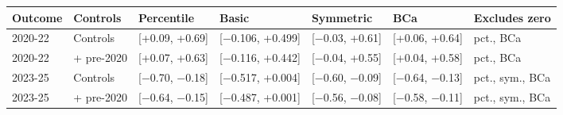 \footnotesize\setlength{\tabcolsep}{3pt}
\begin{tabular}{lllllll}
\toprule
Outcome & Controls & Percentile & Basic & Symmetric & BCa & Excludes zero \\
\midrule
2020-22 & Controls & [+0.09, +0.69] & [$-$0.106, +0.499] & [$-$0.03, +0.61] & [+0.06, +0.64] & pct., BCa \\
2020-22 & + pre-2020 & [+0.07, +0.63] & [$-$0.116, +0.442] & [$-$0.04, +0.55] & [+0.04, +0.58] & pct., BCa \\
2023-25 & Controls & [$-$0.70, $-$0.18] & [$-$0.517, +0.004] & [$-$0.60, $-$0.09] & [$-$0.64, $-$0.13] & pct., sym., BCa \\
2023-25 & + pre-2020 & [$-$0.64, $-$0.15] & [$-$0.487, +0.001] & [$-$0.56, $-$0.08] & [$-$0.58, $-$0.11] & pct., sym., BCa \\
\bottomrule
\end{tabular}
